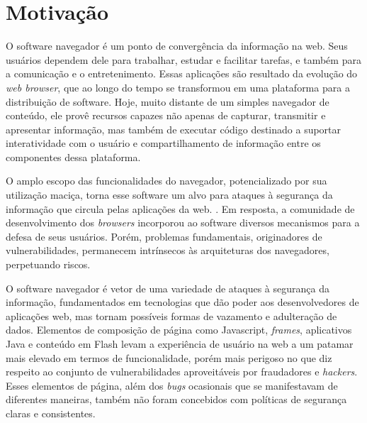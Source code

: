 \section{Motivação}


O software navegador é um ponto de convergência da informação na web. Seus usuários dependem dele para trabalhar, estudar e facilitar tarefas, e também para a comunicação e o entretenimento. Essas aplicações são resultado da evolução do \textit{web browser}, que ao longo do tempo se transformou em uma plataforma para a distribuição de software. Hoje, muito distante de um simples navegador de conteúdo, ele provê recursos capazes não apenas de capturar, transmitir e apresentar informação, mas também de executar código destinado a suportar interatividade com o usuário e compartilhamento de informação entre os componentes dessa plataforma.

O amplo escopo das funcionalidades do navegador, potencializado por sua utilização maciça, torna esse software um alvo para ataques à segurança da informação que circula pelas aplicações da web. . Em resposta, a comunidade de desenvolvimento dos \textit{browsers} incorporou ao software diversos mecanismos para a defesa de seus usuários. Porém, problemas fundamentais, originadores de vulnerabilidades, permanecem intrínsecos às arquiteturas dos navegadores, perpetuando riscos.

O software navegador é vetor de uma variedade de ataques à segurança da informação, fundamentados em tecnologias que dão poder aos desenvolvedores de aplicações web, mas tornam possíveis formas de vazamento e adulteração de dados. Elementos de composição de página como Javascript, \textit{frames}, aplicativos Java e conteúdo em Flash levam a experiência de usuário na web a um patamar mais elevado em termos de funcionalidade, porém mais perigoso no que diz respeito ao conjunto de vulnerabilidades aproveitáveis por fraudadores e \textit{hackers}. Esses elementos de página, além dos \textit{bugs} ocasionais que se manifestavam de diferentes maneiras, também não foram concebidos com políticas de segurança claras e consistentes.

